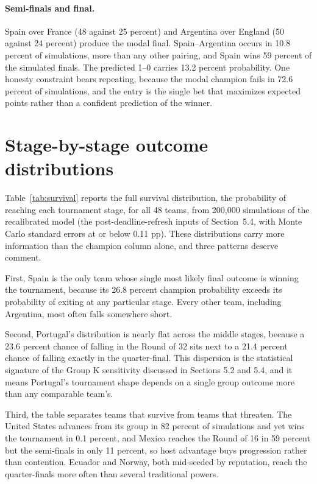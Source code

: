 \documentclass[11pt,letterpaper]{article}
\begin{document}
\paragraph{Semi-finals and final.} Spain over France (48 against 25 percent) and Argentina over England (50 against 24 percent) produce the modal final. Spain--Argentina occurs in 10.8 percent of simulations, more than any other pairing, and Spain wins 59 percent of the simulated finals. The predicted 1--0 carries 13.2 percent probability. One honesty constraint bears repeating, because the modal champion fails in 72.6 percent of simulations, and the entry is the single bet that maximizes expected points rather than a confident prediction of the winner.

\section{Stage-by-stage outcome distributions}\label{app:survival}

Table~\ref{tab:survival} reports the full survival distribution, the probability of reaching each tournament stage, for all 48 teams, from 200{,}000 simulations of the recalibrated model (the post-deadline-refresh inputs of Section~5.4, with Monte Carlo standard errors at or below 0.11 pp). These distributions carry more information than the champion column alone, and three patterns deserve comment.

First, Spain is the only team whose single most likely final outcome is winning the tournament, because its 26.8 percent champion probability exceeds its probability of exiting at any particular stage. Every other team, including Argentina, most often falls somewhere short.

Second, Portugal's distribution is nearly flat across the middle stages, because a 23.6 percent chance of falling in the Round of 32 sits next to a 21.4 percent chance of falling exactly in the quarter-final. This dispersion is the statistical signature of the Group K sensitivity discussed in Sections 5.2 and 5.4, and it means Portugal's tournament shape depends on a single group outcome more than any comparable team's.

Third, the table separates teams that survive from teams that threaten. The United States advances from its group in 82 percent of simulations and yet wins the tournament in 0.1 percent, and Mexico reaches the Round of 16 in 59 percent but the semi-finals in only 11 percent, so host advantage buys progression rather than contention. Ecuador and Norway, both mid-seeded by reputation, reach the quarter-finals more often than several traditional powers.
\end{document}
